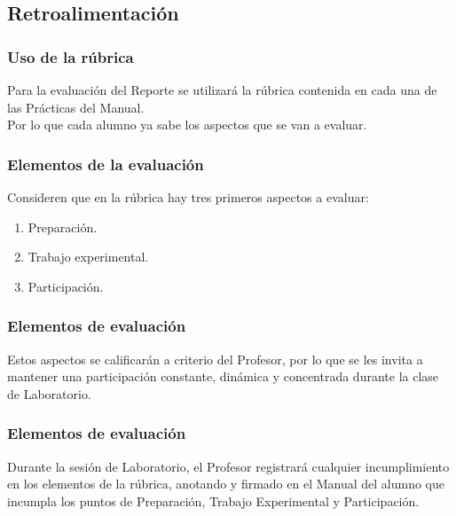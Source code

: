 \documentclass[14pt]{beamer}
\begin{document}
\subsection{Retroalimentación}

\begin{frame}
\frametitle{Uso de la rúbrica}
Para la evaluación del Reporte se utilizará la rúbrica contenida en cada una de las Prácticas del Manual.
\\
\bigskip
\pause
Por lo que cada alumno ya sabe los aspectos que se van a evaluar.
\end{frame}
\begin{frame}
\frametitle{Elementos de la evaluación}
Consideren que en la rúbrica hay tres primeros aspectos a evaluar:
\pause
{}
\begin{enumerate}[<+->]
\item Preparación.
\item Trabajo experimental.
\item Participación.
\end{enumerate}
\end{frame}
\begin{frame}
\frametitle{Elementos de evaluación}
Estos aspectos se calificarán a criterio del Profesor, por lo que se les invita a mantener una participación constante, dinámica y concentrada durante la clase de Laboratorio.
\end{frame}
\begin{frame}
\frametitle{Elementos de evaluación}
Durante la sesión de Laboratorio, el Profesor registrará cualquier incumplimiento en los elementos de la rúbrica, anotando y firmado en el Manual del alumno que incumpla los puntos de Preparación, Trabajo Experimental y Participación.
\end{frame}
\end{document}
